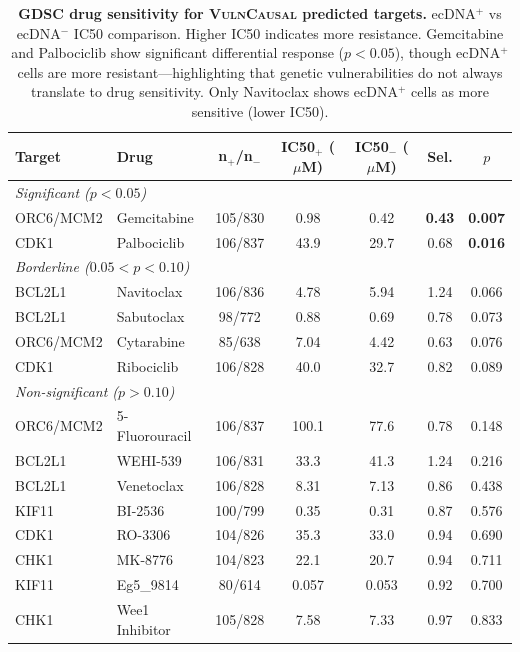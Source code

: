\documentclass{article}
\newcommand{\vulncausal}{\textsc{VulnCausal}}
\begin{document}
\begin{table}[h]
\caption{\textbf{GDSC drug sensitivity for \vulncausal{} predicted targets.} ecDNA$^+$ vs ecDNA$^-$ IC50 comparison. Higher IC50 indicates more resistance. Gemcitabine and Palbociclib show significant differential response ($p < 0.05$), though ecDNA$^+$ cells are more resistant---highlighting that genetic vulnerabilities do not always translate to drug sensitivity. Only Navitoclax shows ecDNA$^+$ cells as more sensitive (lower IC50).}
\label{tab:gdsc_full}
\centering
\small
\begin{tabular}{@{}llccccc@{}}
\toprule
Target & Drug & n$_{+}$/n$_{-}$ & IC50$_{+}$ ($\mu$M) & IC50$_{-}$ ($\mu$M) & Sel. & $p$ \\
\midrule
\multicolumn{7}{l}{\textit{Significant ($p < 0.05$)}} \\
ORC6/MCM2 & Gemcitabine & 105/830 & 0.98 & 0.42 & \textbf{0.43} & \textbf{0.007} \\
CDK1 & Palbociclib & 106/837 & 43.9 & 29.7 & 0.68 & \textbf{0.016} \\
\midrule
\multicolumn{7}{l}{\textit{Borderline ($0.05 < p < 0.10$)}} \\
BCL2L1 & Navitoclax & 106/836 & 4.78 & 5.94 & 1.24 & 0.066 \\
BCL2L1 & Sabutoclax & 98/772 & 0.88 & 0.69 & 0.78 & 0.073 \\
ORC6/MCM2 & Cytarabine & 85/638 & 7.04 & 4.42 & 0.63 & 0.076 \\
CDK1 & Ribociclib & 106/828 & 40.0 & 32.7 & 0.82 & 0.089 \\
\midrule
\multicolumn{7}{l}{\textit{Non-significant ($p > 0.10$)}} \\
ORC6/MCM2 & 5-Fluorouracil & 106/837 & 100.1 & 77.6 & 0.78 & 0.148 \\
BCL2L1 & WEHI-539 & 106/831 & 33.3 & 41.3 & 1.24 & 0.216 \\
BCL2L1 & Venetoclax & 106/828 & 8.31 & 7.13 & 0.86 & 0.438 \\
KIF11 & BI-2536 & 100/799 & 0.35 & 0.31 & 0.87 & 0.576 \\
CDK1 & RO-3306 & 104/826 & 35.3 & 33.0 & 0.94 & 0.690 \\
CHK1 & MK-8776 & 104/823 & 22.1 & 20.7 & 0.94 & 0.711 \\
KIF11 & Eg5\_9814 & 80/614 & 0.057 & 0.053 & 0.92 & 0.700 \\
CHK1 & Wee1 Inhibitor & 105/828 & 7.58 & 7.33 & 0.97 & 0.833 \\
\bottomrule
\end{tabular}
\end{table}
\end{document}
